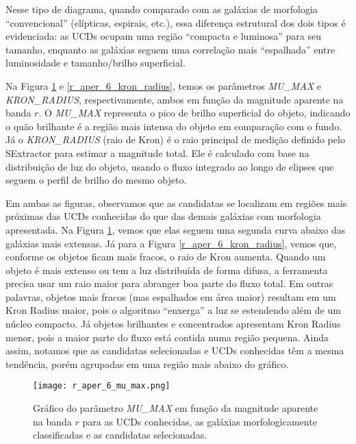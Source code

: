 Nesse tipo de diagrama, quando comparado com as galáxias de morfologia “convencional” (elípticas, espirais, etc.), essa diferença estrutural dos dois tipos é evidenciada: as UCDs ocupam uma região “compacta e luminosa” para seu tamanho, enquanto as galáxias seguem uma correlação mais “espalhada” entre luminosidade e tamanho/brilho superficial.

Na Figura \ref{r_aper_6_mu_max} e \ref{r_aper_6_kron_radius}, temos os parâmetros \textit{MU\_MAX} e \textit{KRON\_RADIUS}, respectivamente, ambos em função da magnitude aparente na banda $r$. O \textit{MU\_MAX} representa o pico de brilho superficial do objeto, indicando o quão brilhante é a região mais intensa do objeto em comparação com o fundo. Já o \textit{KRON\_RADIUS} (raio de Kron) é o raio principal de medição definido pelo SExtractor para estimar a magnitude total. Ele é calculado com base na distribuição de luz do objeto, usando o fluxo integrado ao longo de elipses que seguem o perfil de brilho do mesmo objeto.

Em ambas as figuras, observamos que as candidatas se localizam em regiões mais próximas das UCDs conhecidas do que das demais galáxias com morfologia apresentada. Na Figura \ref{r_aper_6_mu_max}, vemos que elas seguem uma segunda curva abaixo das galáxias mais extensas. Já para a Figura \ref{r_aper_6_kron_radius}, vemos que, conforme os objetos ficam mais fracos, o raio de Kron aumenta. Quando um objeto é mais extenso ou tem a luz distribuída de forma difusa, a ferramenta precisa usar um raio maior para abranger boa parte do fluxo total. Em outras palavras, objetos mais fracos (mas espalhados em área maior) resultam em um Kron Radius maior, pois o algoritmo “enxerga” a luz se estendendo além de um núcleo compacto. Já objetos brilhantes e concentrados apresentam Kron Radius menor, pois a maior parte do fluxo está contida numa região pequena. Ainda assim, notamos que as candidatas selecionadas e UCDs conhecidas têm a mesma tendência, porém agrupadas em uma região mais abaixo do gráfico.

\begin{figure}[!ht]
    \begin{center}
    \texttt{[image: r\_aper\_6\_mu\_max.png]}
    \caption[]{Gráfico do parâmetro \textit{MU\_MAX} em função da magnitude aparente na banda $r$ para as UCDs conhecidas, as galáxias morfologicamente classificadas e as candidatas selecionadas.}
    \label{r_aper_6_mu_max}
    \end{center}
\end{figure}


